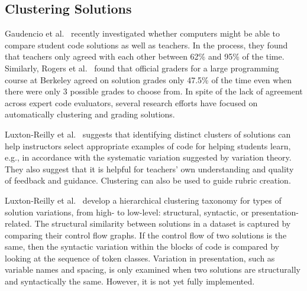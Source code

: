 


\subsection{Clustering Solutions}

Gaudencio et al.~\cite{Gaudencio} recently investigated whether computers might be able to compare student code solutions as well as teachers. In the process, they found that teachers only agreed with each other between 62\% and 95\% of the time. Similarly, Rogers et al.~\cite{ACESthesis} found that official graders for a large programming course at Berkeley agreed on solution grades only 47.5\% of the time even when there were only 3 possible grades to choose from. In spite of the lack of agreement across expert code evaluators, several research efforts have focused on automatically clustering and grading solutions.

Luxton-Reilly et al.~\cite{Luxton13} suggests that identifying distinct clusters of solutions can help instructors select appropriate examples of code for helping students learn, e.g., in accordance with the systematic variation suggested by variation theory. They also suggest that it is helpful for teachers' own understanding and quality of feedback and guidance. Clustering can also be used to guide rubric creation.

Luxton-Reilly et al.~\cite{Luxton13} develop a hierarchical clustering taxonomy for types of solution variations, from high- to low-level: structural, syntactic, or presentation-related. The structural similarity between solutions in a dataset is captured by comparing their control flow graphs. If the control flow of two solutions is the same, then the syntactic variation within the blocks of code is compared by looking at the sequence of token classes. Variation in presentation, such as variable names and spacing, is only examined when two solutions are structurally and syntactically the same. However, it is not yet fully implemented. %

